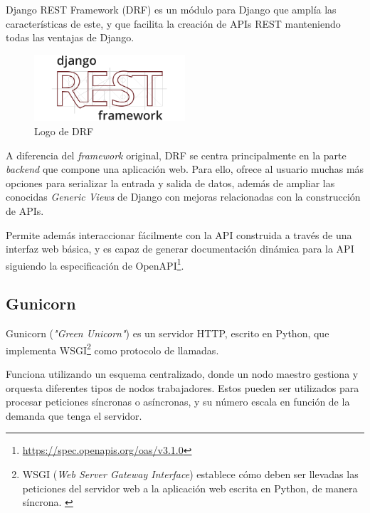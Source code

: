 Django REST Framework (DRF) es un módulo para Django que amplía las características de este, y que facilita la creación de APIs REST manteniendo todas las ventajas de Django. \emph{\parencite{Reference7}}

\begin{figure}[ht]
    \centering
    \includegraphics[width=0.5\textwidth]{Figures/drf-logo}
    \decoRule
    \caption[DRF (Logo)]{Logo de DRF \emph{\parencite{Reference8}}}
    \label{fig:drf-logo}
\end{figure}

A diferencia del \emph{framework} original, DRF se centra principalmente en la parte \emph{backend} que compone una aplicación web. Para ello, ofrece al usuario muchas más opciones para serializar la entrada y salida de datos, además de ampliar las conocidas \emph{Generic Views} de Django con mejoras relacionadas con la construcción de APIs. \emph{\parencite{Reference7}}

Permite además interaccionar fácilmente con la API construida a través de una interfaz web básica, y es capaz de generar documentación dinámica para la API siguiendo la especificación de OpenAPI\footnote{\url{https://spec.openapis.org/oas/v3.1.0}}. \emph{\parencite{Reference7}}

\subsection{Gunicorn}\label{sec:gunicorn}

Gunicorn (\emph{"Green Unicorn"}) es un servidor HTTP, escrito en Python, que implementa WSGI\footnote{WSGI (\emph{Web Server Gateway Interface}) establece cómo deben ser llevadas las peticiones del servidor web a la aplicación web escrita en Python, de manera síncrona. \emph{\parencite{Reference11}}} como protocolo de llamadas.

Funciona utilizando un esquema centralizado, donde un nodo maestro gestiona y orquesta diferentes tipos de nodos trabajadores. Estos pueden ser utilizados para procesar peticiones síncronas o asíncronas, y su número escala en función de la demanda que tenga el servidor. \emph{\parencite{Reference9}}

